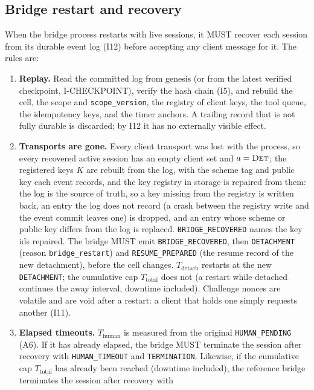 \subsection{Bridge restart and recovery}\label{sec:recovery}

When the bridge process restarts with live sessions, it MUST recover
each session from its durable event log (I12) before accepting any
client message for it. The rules are:

\begin{enumerate}[leftmargin=2em]
\item \textbf{Replay.} Read the committed log from genesis (or from the
latest verified checkpoint, I-CHECKPOINT), verify the hash chain (I5),
and rebuild the cell, the scope and \texttt{scope\_version}, the
registry of client keys, the tool queue, the idempotency keys, and the
timer anchors. A trailing record
that is not fully durable is discarded; by I12 it has no externally
visible effect.
\item \textbf{Transports are gone.} Every client transport was lost with
the process, so every recovered active session has an empty client set
and $a=\textsc{Det}$; the registered keys $K$ are rebuilt from the log,
with the scheme tag and public key each event records, and the key registry
in storage is repaired from them: the log is the source of truth, so a key
missing from the registry is written back, an entry the log does not record
(a crash between the registry write and the event commit leaves one) is
dropped, and an entry whose scheme or public key differs from the log is
replaced. \texttt{BRIDGE\_RECOVERED} names the key ids repaired.
The bridge MUST emit \texttt{BRIDGE\_RECOVERED}, then \texttt{DETACHMENT}
(reason \texttt{bridge\_restart}) and \texttt{RESUME\_PREPARED} (the
resume record of the new detachment), before the cell changes.
$T_{\text{detach}}$ restarts at the new \texttt{DETACHMENT}; the
cumulative cap $T_{\text{total}}$ does not (a restart while detached
continues the away interval, downtime included). Challenge
nonces are volatile and are void after a restart: a client that holds
one simply requests another (I11).
\item \textbf{Elapsed timeouts.} $T_{\text{human}}$ is measured from the
original \texttt{HUMAN\_PENDING} (A6). If it has already elapsed, the
bridge MUST terminate the session after recovery with
\texttt{HUMAN\_TIMEOUT} and \texttt{TERMINATION}. Likewise, if the
cumulative cap $T_{\text{total}}$ has already been reached (downtime
included), the reference bridge terminates the session after recovery with

\end{enumerate}
